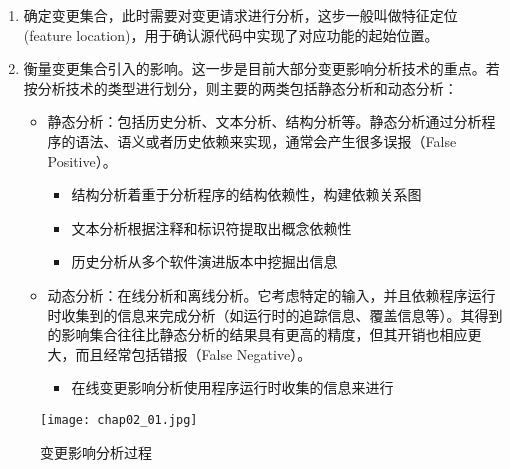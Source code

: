 \begin{enumerate}
	\item 确定变更集合，此时需要对变更请求进行分析，这步一般叫做特征定位(feature location)，用于确认源代码中实现了对应功能的起始位置\cite{biggerstaff1993concept}。
	\item 衡量变更集合引入的影响。这一步是目前大部分变更影响分析技术的重点。若按分析技术的类型进行划分，则主要的两类包括静态分析和动态分析：
	\begin{itemize}
	
	\item 静态分析：包括历史分析、文本分析、结构分析等\cite{sun2012comparative,kagdi2007survey}。静态分析通过分析程序的语法、语义或者历史依赖来实现，通常会产生很多误报（False Positive）。
		\begin{itemize}
		\item 结构分析着重于分析程序的结构依赖性，构建依赖关系图
		\item 文本分析根据注释和标识符提取出概念依赖性
		\item 历史分析从多个软件演进版本中挖掘出信息
		\end{itemize}
	
	\item 动态分析：在线分析和离线分析。它考虑特定的输入，并且依赖程序运行时收集到的信息来完成分析（如运行时的追踪信息、覆盖信息等）\cite{law2003whole}。其得到的影响集合往往比静态分析的结果具有更高的精度，但其开销也相应更大，而且经常包括错报（False Negative）。
		\begin{itemize}
		\item 在线变更影响分析使用程序运行时收集的信息来进行
		\end{itemize}
		

		
	\end{itemize}
\end{enumerate}

\begin{figure}[H]
	\centering
	\texttt{[image: chap02\_01.jpg]}
	\caption {变更影响分析过程}
	\label {变更影响分析process} 
\end{figure}

